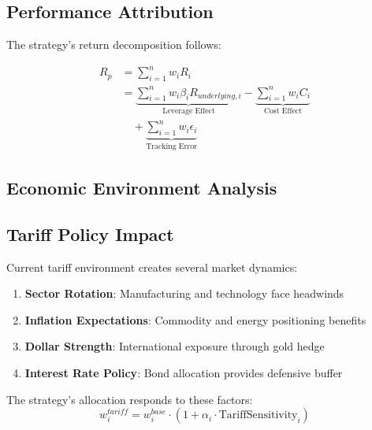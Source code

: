 \documentclass[11pt]{IEEEtran}
\begin{document}
\begin{multicols}{2}

\subsection{Performance Attribution}

The strategy's return decomposition follows:

\end{multicols}

\begin{align}
R_p &= \sum_{i=1}^n w_i R_i \\
&= \underbrace{\sum_{i=1}^n w_i \beta_i R_{underlying,i}}_{\text{Leverage Effect}} - \underbrace{\sum_{i=1}^n w_i C_i}_{\text{Cost Effect}} \\
&\quad + \underbrace{\sum_{i=1}^n w_i \epsilon_i}_{\text{Tracking Error}}
\end{align}

\begin{multicols}{2}

\section{Economic Environment Analysis}

\subsection{Tariff Policy Impact}

Current tariff environment creates several market dynamics:

\begin{enumerate}
    \item \textbf{Sector Rotation}: Manufacturing and technology face headwinds
    \item \textbf{Inflation Expectations}: Commodity and energy positioning benefits
    \item \textbf{Dollar Strength}: International exposure through gold hedge
    \item \textbf{Interest Rate Policy}: Bond allocation provides defensive buffer
\end{enumerate}

\end{multicols}

The strategy's allocation responds to these factors:
\begin{equation}
w_i^{tariff} = w_i^{base} \cdot (1 + \alpha_i \cdot \text{TariffSensitivity}_i)
\end{equation}
\end{document}
